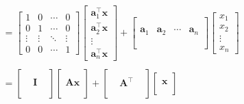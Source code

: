 \documentclass[12pt,thmsa]{article}
\begin{document}
\begin{itemize}
\[\begin{aligned}
		& = \left[ \begin{array}{cccc} 
				1  & 0 & \cdots & 0 \\
				0 & 1  & \cdots & 0 \\
				\vdots  & \vdots & \ddots & \vdots   \\
				0 & 0 & \cdots & 1 
				 \end{array}\right]
			 \left[ \begin{array}{c} 
			 	\boldsymbol{a}_{1}^{\top}\boldsymbol{x} \\
			 	\boldsymbol{a}_{2}^{\top}\boldsymbol{x} \\
			 	\vdots     \\
			 	\boldsymbol{a}_{n}^{\top}\boldsymbol{x}
			 \end{array}\right] 
		  + \left[ \begin{array}{cccc}
			  	& & &  \\
			  	& & &  \\
			  	\boldsymbol{a}_{1} & \boldsymbol{a}_{2} & \cdots & \boldsymbol{a}_{n} \\
			  	& & &  \\
			  	& & &  \\
			  \end{array}
			  \right]
			  \left[ \begin{array}{c} x_{1} \\ x_{2} \\ \vdots \\ x_{n} \end{array}\right]
		\\
		& \\
		&= \left[ \begin{array}{ccc} && \\  &\mathbf{I}& \\ &&\\ \end{array} \right]
			\left[ \begin{array}{c} \\  \mathbf{A}\boldsymbol{x} \\ \\ \end{array} \right]
		  + \left[ \begin{array}{ccc} && \\  &\mathbf{A}^{\top}& \\ &&\\ \end{array} \right]
		  	\left[ \begin{array}{c} \\ \boldsymbol{x} \\ \\ \end{array} \right] 

\end{aligned}\]
\end{itemize}
\end{document}
